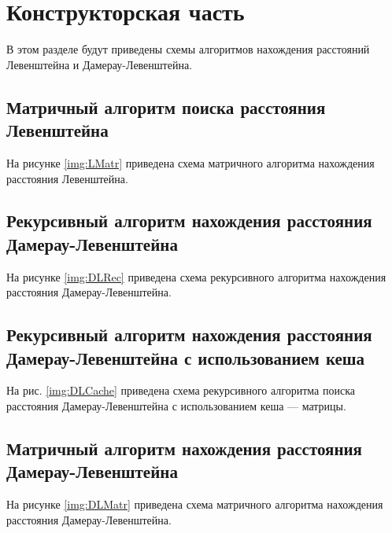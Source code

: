 \chapter{Конструкторская часть}
В этом разделе будут приведены схемы алгоритмов нахождения расстояний Левенштейна и Дамерау-Левенштейна.

\section{Матричный алгоритм поиска расстояния Левенштейна} 
На рисунке \ref{img:LMatr} приведена схема матричного алгоритма нахождения расстояния Левенштейна.
\clearpage

\section{Рекурсивный алгоритм нахождения расстояния Дамерау-Левенштейна}
На рисунке \ref{img:DLRec} приведена схема рекурсивного алгоритма нахождения расстояния Дамерау-Левенштейна.
\clearpage

\section{Рекурсивный алгоритм нахождения расстояния Дамерау-Левенштейна с использованием кеша}
На рис. \ref{img:DLCache} приведена схема рекурсивного алгоритма поиска расстояния Дамерау-Левенштейна с использованием кеша --- матрицы.
\clearpage

\section{Матричный алгоритм нахождения расстояния Дамерау-Левенштейна}
На рисунке \ref{img:DLMatr} приведена схема матричного алгоритма нахождения расстояния Дамерау-Левенштейна.

















